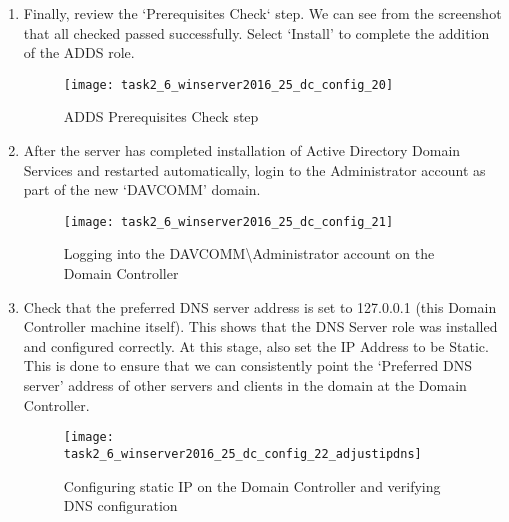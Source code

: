 \begin{enumerate}[series=task2methodology3]
\begin{enumerate}[label=(\alph*)]
\begin{figure}[H]
        \end{figure}
      \item Finally, review the `Prerequisites Check` step. We can see from the screenshot that all checked passed successfully. Select `Install' to complete the addition of the ADDS role.
        \begin{figure}[H]
          \centering
          \captionsetup{skip=2pt}
          \texttt{[image: task2\_6\_winserver2016\_25\_dc\_config\_20]}
          \caption{ADDS Prerequisites Check step}
          \label{fig:task2:vspherec_windc2_c20}
        \end{figure}
      \item After the server has completed installation of Active Directory Domain Services and restarted automatically, login to the Administrator account as part of the new `DAVCOMM' domain.
        \begin{figure}[H]
          \centering
          \captionsetup{skip=2pt}
          \texttt{[image: task2\_6\_winserver2016\_25\_dc\_config\_21]}
          \caption{Logging into the DAVCOMM\textbackslash Administrator account on the Domain Controller}
          \label{fig:task2:vspherec_windc2_c21}
        \end{figure}
      \item Check that the preferred DNS server address is set to 127.0.0.1 (this Domain Controller machine itself). This shows that the DNS Server role was installed and configured correctly. At this stage, also set the IP Address to be Static. This is done to ensure that we can consistently point the `Preferred DNS server' address of other servers and clients in the domain at the Domain Controller.
        \begin{figure}[H]
          \centering
          \captionsetup{skip=2pt}
          \texttt{[image: task2\_6\_winserver2016\_25\_dc\_config\_22\_adjustipdns]}
          \caption{Configuring static IP on the Domain Controller and verifying DNS configuration}
          \label{fig:task2:vspherec_windc2_c22}
        \end{figure}
   \end{enumerate}
\end{enumerate}


